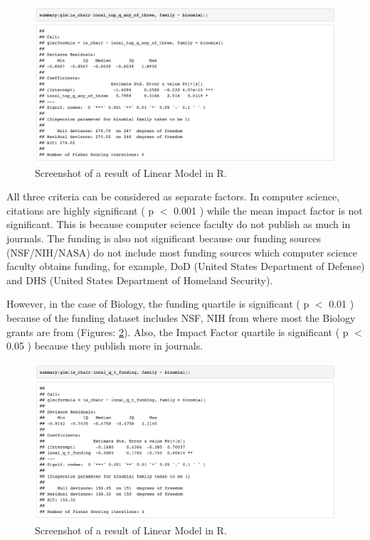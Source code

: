  \begin{figure}
  \centering
  \includegraphics[width=\textwidth]{figures/CS-Local-Quartile}
  \caption{Screenshot of a result of Linear Model in R.}
  \label{fig:CS-Local-Quartile}
\end{figure}

All three criteria can be considered as separate factors. In computer science, citations are highly significant ( p $<$ 0.001 ) while the mean impact factor is not significant. This is because computer science faculty do not publish as much in journals. The funding is also not significant because our funding sources (NSF/NIH/NASA) do not include most funding sources which computer science faculty obtains funding, for example, DoD (United States Department of Defense) and DHS (United States Department of Homeland Security).

However, in the case of Biology, the funding quartile is significant ( p $<$ 0.01 ) because of the funding dataset includes NSF, NIH from where most the Biology grants are from (Figures: \ref{fig:BIO-local-funding}). Also, the Impact Factor quartile is significant ( p $<$ 0.05 ) because they publish more in journals.

 \begin{figure}
  \centering
  \includegraphics[width=\textwidth]{figures/BIO-local-funding}
  \caption{Screenshot of a result of Linear Model in R.}
  \label{fig:BIO-local-funding}
\end{figure}

